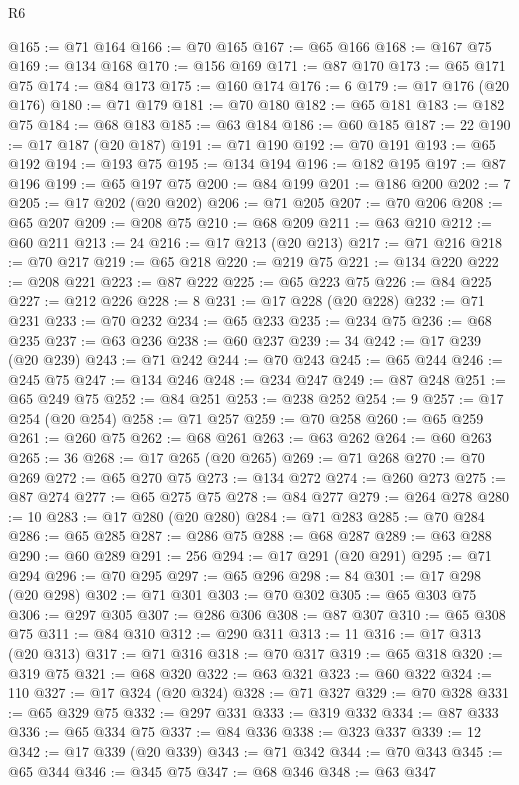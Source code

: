 \begin{lexlean}{R6}
\begin{coremodule}
@165 := @71 @164
@166 := @70 @165
@167 := @65 @166
@168 := @167 @75
@169 := @134 @168
@170 := @156 @169
@171 := @87 @170
@173 := @65 @171 @75
@174 := @84 @173
@175 := @160 @174
@176 := 6
@179 := @17 @176 (@20 @176)
@180 := @71 @179
@181 := @70 @180
@182 := @65 @181
@183 := @182 @75
@184 := @68 @183
@185 := @63 @184
@186 := @60 @185
@187 := 22
@190 := @17 @187 (@20 @187)
@191 := @71 @190
@192 := @70 @191
@193 := @65 @192
@194 := @193 @75
@195 := @134 @194
@196 := @182 @195
@197 := @87 @196
@199 := @65 @197 @75
@200 := @84 @199
@201 := @186 @200
@202 := 7
@205 := @17 @202 (@20 @202)
@206 := @71 @205
@207 := @70 @206
@208 := @65 @207
@209 := @208 @75
@210 := @68 @209
@211 := @63 @210
@212 := @60 @211
@213 := 24
@216 := @17 @213 (@20 @213)
@217 := @71 @216
@218 := @70 @217
@219 := @65 @218
@220 := @219 @75
@221 := @134 @220
@222 := @208 @221
@223 := @87 @222
@225 := @65 @223 @75
@226 := @84 @225
@227 := @212 @226
@228 := 8
@231 := @17 @228 (@20 @228)
@232 := @71 @231
@233 := @70 @232
@234 := @65 @233
@235 := @234 @75
@236 := @68 @235
@237 := @63 @236
@238 := @60 @237
@239 := 34
@242 := @17 @239 (@20 @239)
@243 := @71 @242
@244 := @70 @243
@245 := @65 @244
@246 := @245 @75
@247 := @134 @246
@248 := @234 @247
@249 := @87 @248
@251 := @65 @249 @75
@252 := @84 @251
@253 := @238 @252
@254 := 9
@257 := @17 @254 (@20 @254)
@258 := @71 @257
@259 := @70 @258
@260 := @65 @259
@261 := @260 @75
@262 := @68 @261
@263 := @63 @262
@264 := @60 @263
@265 := 36
@268 := @17 @265 (@20 @265)
@269 := @71 @268
@270 := @70 @269
@272 := @65 @270 @75
@273 := @134 @272
@274 := @260 @273
@275 := @87 @274
@277 := @65 @275 @75
@278 := @84 @277
@279 := @264 @278
@280 := 10
@283 := @17 @280 (@20 @280)
@284 := @71 @283
@285 := @70 @284
@286 := @65 @285
@287 := @286 @75
@288 := @68 @287
@289 := @63 @288
@290 := @60 @289
@291 := 256
@294 := @17 @291 (@20 @291)
@295 := @71 @294
@296 := @70 @295
@297 := @65 @296
@298 := 84
@301 := @17 @298 (@20 @298)
@302 := @71 @301
@303 := @70 @302
@305 := @65 @303 @75
@306 := @297 @305
@307 := @286 @306
@308 := @87 @307
@310 := @65 @308 @75
@311 := @84 @310
@312 := @290 @311
@313 := 11
@316 := @17 @313 (@20 @313)
@317 := @71 @316
@318 := @70 @317
@319 := @65 @318
@320 := @319 @75
@321 := @68 @320
@322 := @63 @321
@323 := @60 @322
@324 := 110
@327 := @17 @324 (@20 @324)
@328 := @71 @327
@329 := @70 @328
@331 := @65 @329 @75
@332 := @297 @331
@333 := @319 @332
@334 := @87 @333
@336 := @65 @334 @75
@337 := @84 @336
@338 := @323 @337
@339 := 12
@342 := @17 @339 (@20 @339)
@343 := @71 @342
@344 := @70 @343
@345 := @65 @344
@346 := @345 @75
@347 := @68 @346
@348 := @63 @347

\end{coremodule}
\end{lexlean}
